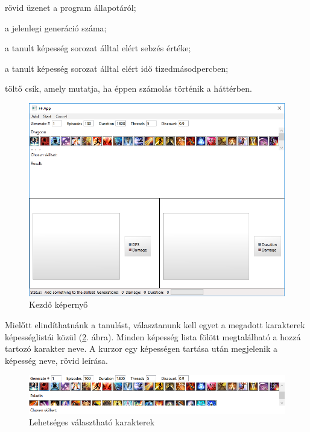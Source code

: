 \documentclass[12pt]{article}
\begin{document}
	\begin{description}[align=right,labelwidth=3cm]
		\item [Status] rövid üzenet a program állapotáról;
		\item [Generations] a jelenlegi generáció száma;
		\item [Damage] a tanult képesség sorozat álltal elért sebzés értéke;
		\item [Duration] a tanult képesség sorozat álltal elért idő tizedmásodpercben;
		\item [Progress Bar] töltő csík, amely mutatja, ha éppen számolás történik a háttérben.
	\end{description}
	
	\begin{figure}[H]
		\begin{center}
			\includegraphics[width=1\textwidth]{start}
		\end{center}
		\caption{Kezdő képernyő}
		\label{fig:start}
	\end{figure}
	
	Mielőtt elindíthatnánk a tanulást, választanunk kell egyet a megadott karakterek képességlistái közül (\ref{fig:skilllist}. ábra). Minden képesség lista fölött megtalálható a hozzá tartozó karakter neve. A kurzor egy képességen tartása után megjelenik a képesség neve, rövid leírása. 
	
	\begin{figure}[H]
		\begin{center}
			\includegraphics[width=1\textwidth]{skilllist}
		\end{center}
		\caption{Lehetséges választható karakterek}
		\label{fig:skilllist}
	\end{figure}
	
\end{document}
